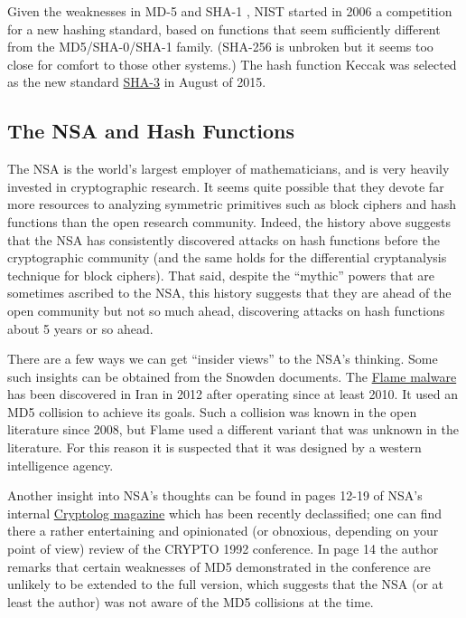 Given the weaknesses in MD-5 and SHA-1 , NIST started in 2006 a
competition for a new hashing standard, based on functions that seem
sufficiently different from the MD5/SHA-0/SHA-1 family. (SHA-256 is
unbroken but it seems too close for comfort to those other systems.) The
hash function Keccak was selected as the new standard
\href{https://goo.gl/Bx1bu2}{SHA-3} in August of 2015.

\subsection{The NSA and Hash Functions}\label{7-The-NSA-and-Hash-Funct}

The NSA is the world's largest employer of mathematicians, and is very
heavily invested in cryptographic research. It seems quite possible that
they devote far more resources to analyzing symmetric primitives such as
block ciphers and hash functions than the open research community.
Indeed, the history above suggests that the NSA has consistently
discovered attacks on hash functions before the cryptographic community
(and the same holds for the differential cryptanalysis technique for
block ciphers). That said, despite the ``mythic'' powers that are
sometimes ascribed to the NSA, this history suggests that they are ahead
of the open community but not so much ahead, discovering attacks on hash
functions about 5 years or so ahead.

There are a few ways we can get ``insider views'' to the NSA's thinking.
Some such insights can be obtained from the Snowden documents. The
\href{https://en.wikipedia.org/wiki/Flame_(malware)}{Flame malware} has
been discovered in Iran in 2012 after operating since at least 2010. It
used an MD5 collision to achieve its goals. Such a collision was known
in the open literature since 2008, but Flame used a different variant
that was unknown in the literature. For this reason it is suspected that
it was designed by a western intelligence agency.

Another insight into NSA's thoughts can be found in pages 12-19 of NSA's
internal
\href{https://www.nsa.gov/public_info/_files/cryptologs/cryptolog_126.pdf}{Cryptolog
magazine} which has been recently declassified; one can find there a
rather entertaining and opinionated (or obnoxious, depending on your
point of view) review of the CRYPTO 1992 conference. In page 14 the
author remarks that certain weaknesses of MD5 demonstrated in the
conference are unlikely to be extended to the full version, which
suggests that the NSA (or at least the author) was not aware of the MD5
collisions at the time.

